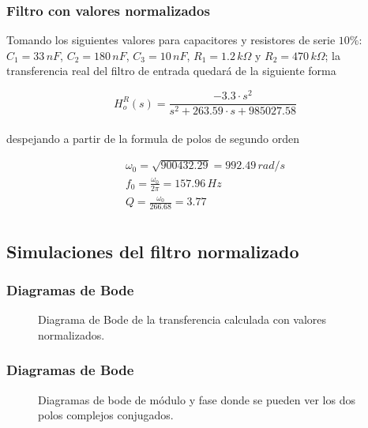 \documentclass[10pt,a4paper]{article}
\begin{document}
    \subsubsection{Filtro con valores normalizados}

    Tomando los siguientes valores para capacitores y resistores de serie $10\%$:
    $C_{1} = 33 \, nF$, $C_{2} = 180 \, nF$, $C_{3} = 10 \, nF$, $R_{1} = 1.2 \, k\Omega$ y $R_{2} = 470 \, k\Omega$; la transferencia real del filtro de entrada quedará de la siguiente forma

    \[H_{o}^{R}(s)=  \frac{-3.3 \cdot s^{2}}{s^{2}+263.59 \cdot s + 985027.58}\] \\

    despejando a partir de la formula de polos de segundo orden

    \begin{gather*}
        \omega_{0}= \sqrt{900432.29} = 992.49 \, rad/s\\
        f_{0}= \frac{\omega_{0}}{2\pi} = 157.96 \, Hz\\
        Q= \frac{\omega_{0}}{266.68} = 3.77\\
    \end{gather*}

    \subsection{Simulaciones del filtro normalizado}
    \subsubsection{Diagramas de Bode}
    \begin{figure}[H]
        \centering
        \scalebox{0.85}{}
        \caption{Diagrama de Bode de la transferencia calculada con valores normalizados.}
        \label{fig}
    \end{figure}

    \subsubsection{Diagramas de Bode}
    \begin{figure}[H]
        \centering
        \scalebox{0.85}{}
        \caption{Diagramas de bode de módulo y fase donde se pueden ver los dos polos complejos conjugados.}
        \label{fig}
    \end{figure}
\end{document}
